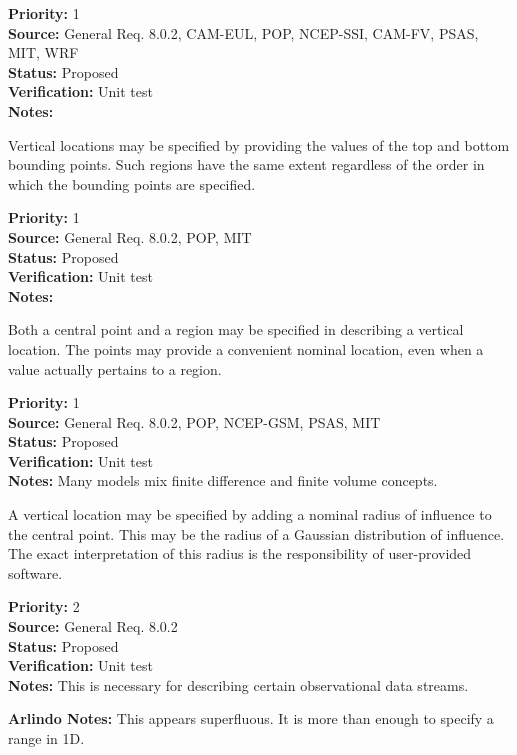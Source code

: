 \begin{reqlist}
{\bf Priority:} 1 \\
{\bf Source:} General Req. 8.0.2, CAM-EUL, POP, NCEP-SSI,
              CAM-FV, PSAS, MIT, WRF \\
{\bf Status:} Proposed \\
{\bf Verification:} Unit test\\
{\bf Notes:} 
\end{reqlist}


Vertical locations may be specified by providing the values of the top and
bottom bounding points.  Such regions have the same extent regardless of the
order in which the bounding points are specified.
\begin{reqlist}
{\bf Priority:} 1 \\
{\bf Source:} General Req. 8.0.2, POP, MIT \\
{\bf Status:} Proposed \\
{\bf Verification:} Unit test\\
{\bf Notes:} 
\end{reqlist}


  Both a central point and a region may be specified in describing a vertical
location.  The points may provide a convenient nominal location, even when
a value actually pertains to a region.
\begin{reqlist}
{\bf Priority:} 1 \\
{\bf Source:} General Req. 8.0.2, POP, NCEP-GSM,
              PSAS, MIT \\
{\bf Status:} Proposed \\
{\bf Verification:} Unit test\\
{\bf Notes:} Many models mix finite difference and finite volume concepts.
\end{reqlist}


  A vertical location may be specified by adding a nominal radius of
influence to the central point.  This may be the radius of a Gaussian
distribution of influence. The exact interpretation of this radius is
the responsibility of user-provided software.
\begin{reqlist}
{\bf Priority:} 2 \\
{\bf Source:} General Req. 8.0.2 \\
{\bf Status:} Proposed \\
{\bf Verification:} Unit test\\
{\bf Notes:} This is necessary for describing certain observational data streams.
\end{reqlist}
{\bf Arlindo Notes: } This appears superfluous. It is more than enough to specify a range in 1D.
 
